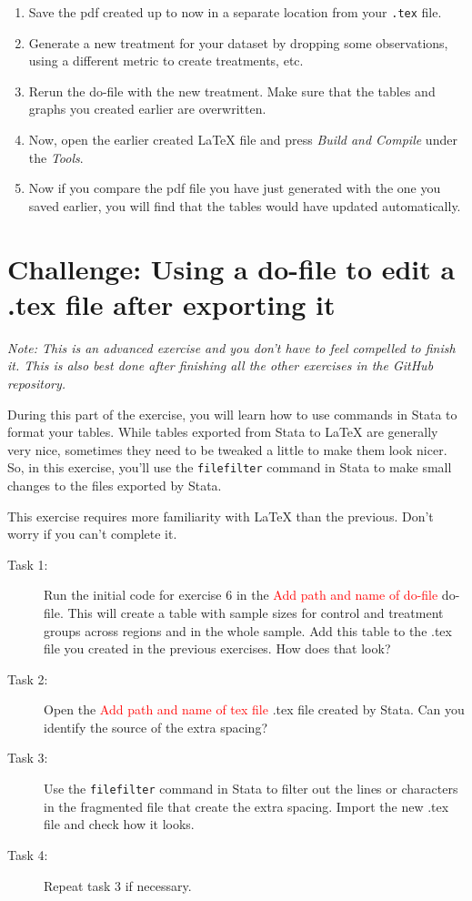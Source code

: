 \documentclass[12pts]{report}
\begin{document}
\begin{enumerate}
	\item Save the pdf created up to now in a separate location from your \texttt{.tex} file. 
	\item Generate a new treatment for your dataset by dropping some observations, using a different metric to create treatments, etc. 
	\item Rerun the do-file with the new treatment. Make sure that the tables and graphs you created earlier are overwritten. 
	\item Now, open the earlier created {\LaTeX} file and press \textit{Build and Compile} under the \textit{Tools}.
	\item Now if you compare the pdf file you have just generated with the one you saved earlier, you will find that the tables would have updated automatically. 
\end{enumerate}

\section*{Challenge: Using a do-file to edit a .tex file after exporting it}
\textit{Note: This is an advanced exercise and you don't have to feel compelled to finish it. This is also best done after finishing all the other exercises in the GitHub repository.}
 
During this part of the exercise, you will learn how to use commands in Stata to format your tables. While tables exported from Stata to {\LaTeX} are generally very nice, sometimes they need to be tweaked a little to make them look nicer. So, in this exercise, you'll use the \texttt{filefilter} command in Stata to make small changes to the files exported by Stata. 

This exercise requires more familiarity with {\LaTeX} than the previous. Don't worry if you can't complete it. 

\begin{description}
	\item[Task 1:] Run the initial code for exercise 6 in the \textcolor{red}{Add path and name of do-file} do-file. This will create a table with sample sizes for control and treatment groups across regions and in the whole sample. Add this table to the .tex file you created in the previous exercises. How does that look?
	\item[Task 2:] Open the \textcolor{red}{Add path and name of tex file} .tex file created by Stata. Can you identify the source of the extra spacing?
	\item[Task 3:] Use the \texttt{filefilter} command in Stata to filter out the lines or characters in the fragmented file that create the extra spacing. Import the new .tex file and check how it looks.
	\item[Task 4:] Repeat task 3 if necessary.
\end{description}
\end{document}
